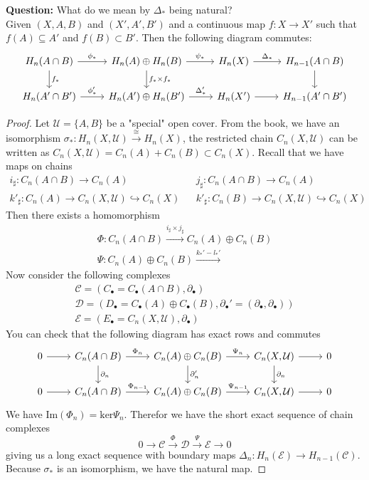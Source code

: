 \documentclass{article}
\begin{document}
\textbf{Question:} What do we mean by $\Delta_*$ being natural?\\
Given $(X,A,B)$ and $(X', A', B')$ and a continuous map $f: X \to X'$ such that $f(A) \subseteq A'$ and $f(B) \subset B'$. Then the following diagram commutes:
\[
\begin{tikzcd}
H_n(A \cap B) \arrow[r, "\phi_*"] \arrow[d, "f_*"] & H_n(A) \oplus H_n(B) \arrow[d, "f_*\times f_*"] \arrow[r, "\psi_*"] & H_n(X) \arrow[r, "\Delta_*"]  & H_{n-1}(A \cap B) \arrow[d] \\
H_n(A' \cap B') \arrow[r, "\phi_*'"] & H_n(A') \oplus H_n(B') \arrow[r, "\Delta_*'"] & H_n(X') \arrow[r]& H_{n-1}(A' \cap B')
\end{tikzcd}
\]
\begin{proof}
Let $\mathcal{U} = \{ A, B \}$ be a "special" open cover. 
From the book, we have an isomorphism 
$\sigma_*:H_n(X, \mathcal{U}) \xrightarrow{\cong} H_n(X)$, the restricted chain $C_n(X, \mathcal{U})$ can be written as $C_n(X, \mathcal{U}) = C_n(A) + C_n(B) \subset C_n(X)$. Recall that we have maps on chains
\begin{align*}
i_\sharp: C_n(A \cap B) \to C_n(A) & & j_\sharp: C_n(A \cap B) \to C_n(A)\\
k'_\sharp: C_n(A) \to C_n(X, \mathcal{U}) \hookrightarrow C_n(X) & & k'_\sharp: C_n(B) \to C_n(X, \mathcal{U}) \hookrightarrow C_n(X)
\end{align*}
Then there exists a homomorphism
\begin{align*}
\Phi: C_n(A \cap B) \xrightarrow{i_\sharp \times j_\sharp} C_n(A) \oplus C_n(B) \\
\Psi: C_n(A) \oplus C_n(B) \xrightarrow{k_*' - l_*'}
\end{align*}
 Now consider the following complexes
\begin{align*}
\mathcal{C} = (C_\bullet = C_\bullet(A \cap B), \partial_\bullet) \\
\mathcal{D} = (D_\bullet = C_\bullet(A) \oplus C_\bullet(B), \partial_\bullet' = (\partial_\bullet, \partial_\bullet)) \\
\mathcal{E} = (E_\bullet = C_n(X,\mathcal{U}), \partial_\bullet)
\end{align*}
You can check that the following diagram has exact rows and commutes
\[
\begin{tikzcd}
0 \arrow[r]
& C_n(A \cap B) \arrow[d, "\partial_n"] \arrow[r, "\Phi_n"] 
& C_n(A) \oplus C_n(B) \arrow[r, "\Psi_n"] \arrow[d, "\partial_n'"] 
& C_n(X, \mathcal{U}) \arrow[d, "\partial_n"] \arrow[r] 
& 0 \\
0 \arrow[r]
& C_n(A \cap B) \arrow[r, "\Phi_{n-1}"] 
& C_n(A) \oplus C_n(B) \arrow[r, "\Psi_{n-1}"] 
& C_n(X, \mathcal{U}) \arrow[r] 
& 0
\end{tikzcd}
\]
We have $\text{Im}(\Phi_n) = \text{ker}\Psi_n$. Therefor we have the short exact sequence of chain complexes
\[
0 \to \mathcal{C} \xrightarrow{\Phi} \mathcal{D} \xrightarrow{\Psi} \mathcal{E} \to 0
\]
giving us a long exact sequence with boundary maps $\Delta_n: H_n(\mathcal{E}) \to H_{n-1}(\mathcal{C})$. Because $\sigma_*$ is an isomorphism, we have the natural map.
\end{proof}
\end{document}
